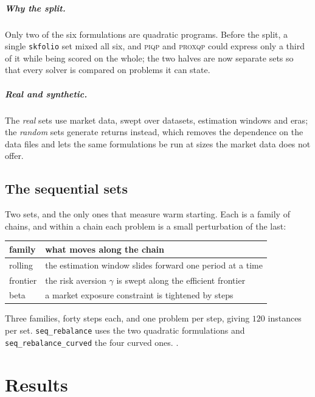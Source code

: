 \documentclass[a4paper,11pt]{book}
\theoremstyle{plain}
\theoremstyle{definition}
\theoremstyle{remark}
\numberwithin{equation}{chapter}
\numberwithin{algorithm}{chapter}
\begin{document}
	\paragraph{Why the split.}
	Only two of the six formulations are quadratic programs. Before the split, a
	single \texttt{skfolio} set mixed all six, and \textsc{piqp} and
	\textsc{proxqp} could express only a third of it while being scored on the
	whole; the two halves are now separate sets so that every solver is compared
	on problems it can state.

	\paragraph{Real and synthetic.}
	The \emph{real} sets use market data, swept over datasets, estimation windows
	and eras; the \emph{random} sets generate returns instead, which removes the
	dependence on the data files and lets the same formulations be run at sizes
	the market data does not offer.

	\section{The sequential sets}

	Two sets, and the only ones that measure warm starting. Each is a family of
	chains, and within a chain each problem is a small perturbation of the last:

	\begin{table}[H]
		\centering\small
		\begin{tabular}{ll}
			\toprule
			family & what moves along the chain\\
			\midrule
			rolling & the estimation window slides forward one period at a time\\
			frontier & the risk aversion $\gamma$ is swept along the efficient
			frontier\\
			beta & a market exposure constraint is tightened by steps\\
			\bottomrule
		\end{tabular}
	\end{table}

	Three families, forty steps each, and one problem per step, giving $120$
	instances per set. \texttt{seq\_rebalance} uses the two quadratic
	formulations and \texttt{seq\_rebalance\_curved} the four curved ones.
.

	\chapter{Results}
\end{document}
